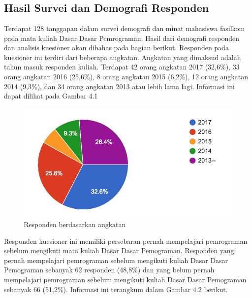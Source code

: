\chapter{\babEmpat}
\section{Hasil Survei dan Demografi Responden}
Terdapat 128 tanggapan dalam survei demografi dan minat mahasiswa fasilkom pada mata kuliah Dasar Dasar Pemrograman. Hasil dari demografi responden dan analisis kuesioner akan dibahas pada bagian berikut.
\linebreak\linebreak
	Responden pada kuesioner ini terdiri dari beberapa angkatan. Angkatan yang dimaksud adalah tahun masuk responden kuliah. Terdapat 42 orang angkatan 2017 (32,6\%), 33 orang angkatan 2016 (25,6\%), 8 orang angkatan 2015 (6,2\%), 12 orang angkatan 2014 (9,3\%), dan 34 orang angkatan 2013 atau lebih lama lagi. Informasi ini dapat dilihat pada Gambar 4.1
	\begin{figure}
		\includegraphics{pics/angkatan}
		\caption{Responden berdasarkan angkatan}
		\centering
	\end{figure}
	Responden kuesioner ini memiliki persebaran pernah mempelajari pemrograman sebelum mengikuti mata kuliah Dasar Dasar Pemograman. Responden yang pernah mempelajari pemrograman sebelum mengikuti kuliah Dasar Dasar Pemograman sebanyak 62 responden (48,8\%) dan yang belum pernah mempelajari pemrograman sebelum mengikuti kuliah Dasar Dasar Pemograman sebanyak 66 (51,2\%). Informasi ini terangkum dalam Gambar 4.2 berikut.

